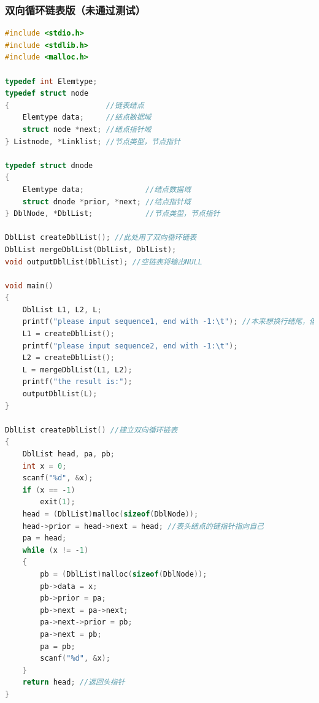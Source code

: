 \documentclass[UTF8]{ctexart}
\begin{document}
	\subsubsection{双向循环链表版（未通过测试）}
	\begin{lstlisting}[language=C++,caption={双向循环链表版},label={dbl_circular_code}]
#include <stdio.h>
#include <stdlib.h>
#include <malloc.h>

typedef int Elemtype;
typedef struct node
{                      //链表结点
    Elemtype data;     //结点数据域
    struct node *next; //结点指针域
} Listnode, *Linklist; //节点类型，节点指针

typedef struct dnode
{
    Elemtype data;              //结点数据域
    struct dnode *prior, *next; //结点指针域
} DblNode, *DblList;            //节点类型，节点指针

DblList createDblList(); //此处用了双向循环链表
DblList mergeDblList(DblList, DblList);
void outputDblList(DblList); //空链表将输出NULL

void main()
{
    DblList L1, L2, L;
    printf("please input sequence1, end with -1:\t"); //本来想换行结尾，但是这样输入就是char了
    L1 = createDblList();
    printf("please input sequence2, end with -1:\t");
    L2 = createDblList();
    L = mergeDblList(L1, L2);
    printf("the result is:");
    outputDblList(L);
}

DblList createDblList() //建立双向循环链表
{
    DblList head, pa, pb;
    int x = 0;
    scanf("%d", &x);
    if (x == -1)
        exit(1);
    head = (DblList)malloc(sizeof(DblNode));
    head->prior = head->next = head; //表头结点的链指针指向自己
    pa = head;
    while (x != -1)
    {
        pb = (DblList)malloc(sizeof(DblNode));
        pb->data = x;
        pb->prior = pa;
        pb->next = pa->next;
        pa->next->prior = pb;
        pa->next = pb;
        pa = pb;
        scanf("%d", &x);
    }
    return head; //返回头指针
}


\end{lstlisting}
\end{document}
